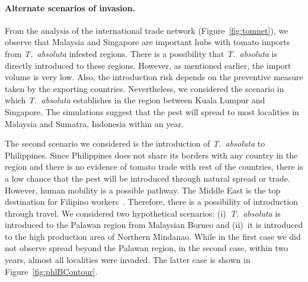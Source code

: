 \documentclass[11pt]{article}
\newcommand{\tuta}{\emph{T.~absoluta}}
\theoremstyle{definition}
\begin{document}


\paragraph{Alternate scenarios of invasion.}
From the analysis of the international trade network
(Figure~\ref{fig:tomnet}), we observe that Malaysia and Singapore are
important hubs with tomato imports from \tuta{} infested regions. There is
a possibility that \tuta{} is directly introduced to these regions. However,
as mentioned earlier, the import volume is very low. Also, the introduction
risk depends on the preventive measure taken by the exporting countries.
Nevertheless, we considered the scenario in which \tuta{} establishes in the region
between Kuala Lumpur and Singapore. The simulations suggest that the pest
will spread to most localities in Malaysia and Sumatra, Indonesia within an
year.

The second scenario we considered is the introduction of \tuta{} to
Philippines. Since Philippines does not share its borders with any country in the region
and there is no evidence of tomato trade with rest of the countries, there
is a low chance that the pest will be introduced through natural spread or
trade.  However, human mobility is a possible pathway. The Middle East is
the top destination for Filipino workers~\cite{rodriguez2011philippine}.
Therefore, there is a possibility of introduction through travel. We
considered two hypothetical scenarios: (i)~\tuta{} is introduced to the Palawan region
from Malaysian Borneo and (ii)~it is introduced to the high production area
of Northern Mindanao. While in the first case we did not observe spread
beyond the Palawan region, in the second case, within two years, almost all
localities were invaded. The latter case is shown in
Figure~\ref{fig:phlBContour}.
\end{document}
